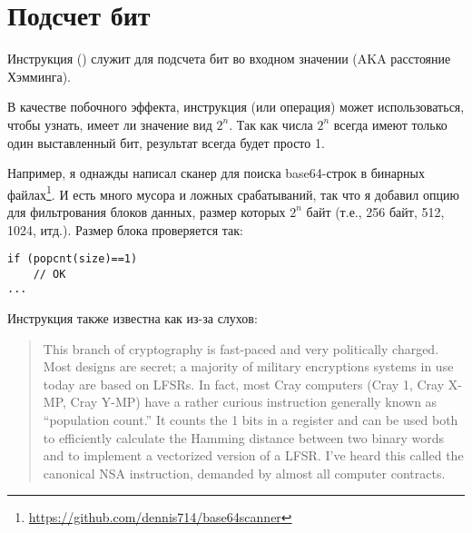 \section{Подсчет бит}
\label{POPCNT}

Инструкция  () служит для подсчета бит во входном значении (\ac{AKA} расстояние Хэмминга).

В качестве побочного эффекта, инструкция  (или операция) может использоваться, чтобы узнать,
имеет ли значение вид $2^n$.
Так как числа $2^n$ всегда имеют только один выставленный бит, результат  всегда будет просто 1.

Например, я однажды написал сканер для поиска base64-строк в бинарных файлах\footnote{\url{https://github.com/dennis714/base64scanner}}.
И есть много мусора и ложных срабатываний, так что я добавил опцию для фильтрования блоков данных, размер которых $2^n$ байт
(т.е., 256 байт, 512, 1024, итд.).
Размер блока проверяется так:

\begin{lstlisting}[style=customc]
if (popcnt(size)==1)
	// OK
...
\end{lstlisting}

Инструкция также известна как  из-за слухов:

\begin{framed}
\begin{quotation}
  This branch of cryptography is fast-paced and very politically charged.
  Most designs are secret; a majority of military encryptions systems in use today are 
  based on LFSRs. 
  In fact, most Cray computers (Cray 1, Cray X-MP, Cray Y-MP) have a rather curious 
  instruction generally known as “population count.” It counts the 1 bits in a register 
  and can be used both to efficiently calculate the Hamming distance between two binary 
  words and to implement a vectorized version of a LFSR. I’ve heard this called the canonical 
  NSA instruction, demanded by almost all computer contracts.
\end{quotation}
\end{framed}
\InSqBrackets{\Schneier{}}

